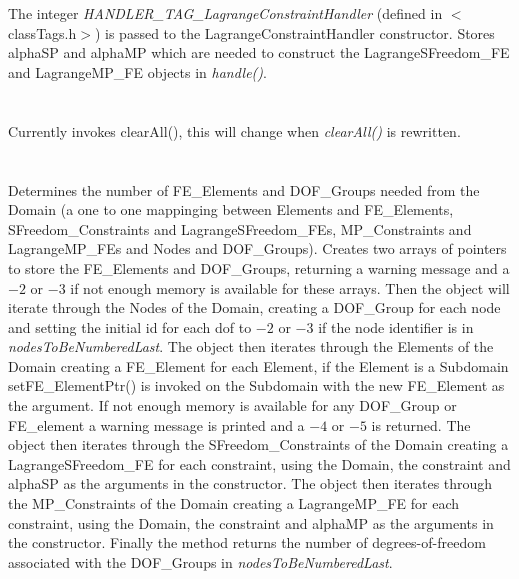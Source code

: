  \\
\\ 
The integer {\em HANDLER\_TAG\_LagrangeConstraintHandler} (defined in
$<$classTags.h$>$) is passed to the LagrangeConstraintHandler
constructor. Stores \p alphaSP and \p alphaMP which are needed
to construct the LagrangeSFreedom\_FE and LagrangeMP\_FE objects in {\em
handle()}. \\

 \\
\\ 
Currently invokes clearAll(), this will change when {\em
clearAll()} is rewritten. \\

\\
 \\
Determines the number of FE\_Elements and DOF\_Groups needed from the
Domain (a one to one mappinging between Elements and FE\_Elements,
SFreedom\_Constraints and LagrangeSFreedom\_FEs, MP\_Constraints and LagrangeMP\_FEs and
Nodes and DOF\_Groups). Creates two arrays of pointers to store the
FE\_Elements and DOF\_Groups, returning a warning message and a $-2$
or $-3$ if not enough memory is available for these arrays. Then the
object will iterate through the Nodes of the Domain, creating a
DOF\_Group for each node and setting the initial id for each dof to
$-2$ or $-3$ if the node identifier is in {\em
nodesToBeNumberedLast}. The object then iterates through the Elements
of the Domain creating a FE\_Element for each Element, if the Element
is a Subdomain setFE\_ElementPtr() is invoked on the Subdomain
with the new FE\_Element as the argument. If not enough memory is
available for any DOF\_Group or FE\_element a warning message is
printed and a $-4$ or $-5$ is returned. 
The object then iterates through the SFreedom\_Constraints
of the Domain creating a LagrangeSFreedom\_FE for each constraint, using the
Domain, the constraint and \p alphaSP as the arguments in the
constructor.
The object then iterates through the MP\_Constraints
of the Domain creating a LagrangeMP\_FE for each constraint, using the
Domain, the constraint and \p alphaMP as the arguments in the constructor.
Finally the method returns the
number of degrees-of-freedom associated with the DOF\_Groups in {\em
nodesToBeNumberedLast}. \\

